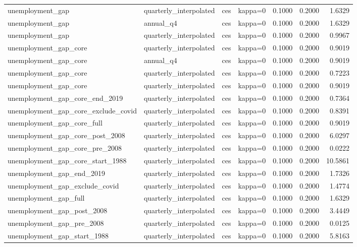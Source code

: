 \begin{tabular}{llllrrr}
unemployment\_gap & quarterly\_interpolated & ces & kappa=0 & 0.1000 & 0.2000 & 1.6329 \\
unemployment\_gap & annual\_q4 & ces & kappa=0 & 0.1000 & 0.2000 & 1.6329 \\
unemployment\_gap & quarterly\_interpolated & ces & kappa=0 & 0.1000 & 0.2000 & 0.9967 \\
unemployment\_gap\_core & quarterly\_interpolated & ces & kappa=0 & 0.1000 & 0.2000 & 0.9019 \\
unemployment\_gap\_core & annual\_q4 & ces & kappa=0 & 0.1000 & 0.2000 & 0.9019 \\
unemployment\_gap\_core & quarterly\_interpolated & ces & kappa=0 & 0.1000 & 0.2000 & 0.7223 \\
unemployment\_gap\_core & quarterly\_interpolated & ces & kappa=0 & 0.1000 & 0.2000 & 0.9019 \\
unemployment\_gap\_core\_end\_2019 & quarterly\_interpolated & ces & kappa=0 & 0.1000 & 0.2000 & 0.7364 \\
unemployment\_gap\_core\_exclude\_covid & quarterly\_interpolated & ces & kappa=0 & 0.1000 & 0.2000 & 0.8391 \\
unemployment\_gap\_core\_full & quarterly\_interpolated & ces & kappa=0 & 0.1000 & 0.2000 & 0.9019 \\
unemployment\_gap\_core\_post\_2008 & quarterly\_interpolated & ces & kappa=0 & 0.1000 & 0.2000 & 6.0297 \\
unemployment\_gap\_core\_pre\_2008 & quarterly\_interpolated & ces & kappa=0 & 0.1000 & 0.2000 & 0.0222 \\
unemployment\_gap\_core\_start\_1988 & quarterly\_interpolated & ces & kappa=0 & 0.1000 & 0.2000 & 10.5861 \\
unemployment\_gap\_end\_2019 & quarterly\_interpolated & ces & kappa=0 & 0.1000 & 0.2000 & 1.7326 \\
unemployment\_gap\_exclude\_covid & quarterly\_interpolated & ces & kappa=0 & 0.1000 & 0.2000 & 1.4774 \\
unemployment\_gap\_full & quarterly\_interpolated & ces & kappa=0 & 0.1000 & 0.2000 & 1.6329 \\
unemployment\_gap\_post\_2008 & quarterly\_interpolated & ces & kappa=0 & 0.1000 & 0.2000 & 3.4449 \\
unemployment\_gap\_pre\_2008 & quarterly\_interpolated & ces & kappa=0 & 0.1000 & 0.2000 & 0.0125 \\
unemployment\_gap\_start\_1988 & quarterly\_interpolated & ces & kappa=0 & 0.1000 & 0.2000 & 5.8163 \\

\end{tabular}
